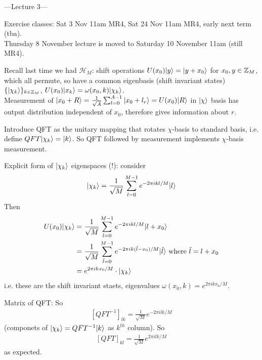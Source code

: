 \documentclass[a4paper]{article}
\begin{document}
---Lecture 3---

Exercise classes: Sat 3 Nov 11am MR4, Sat 24 Nov 11am MR4, early next term (tba).\\
Thursday 8 November lecture is moved to Saturday 10 November 11am (still MR4).

Recall last time we had $\mathcal{H}_M$: shift operations $U(x_0) |y \rangle = |y+x_0\rangle$ for $x_0,y \in \mathbb{Z}_M$, which all permute, so have a common eigenbasis (shift invariant states) $\{|\chi_k\rangle \}_{k \in \mathbb{Z}_M}$, $U(x_0) | x_k\rangle = \omega(x_0,k) |\chi_k\rangle$.\\
Measurement of $|x_0+R \rangle = \frac{1}{\sqrt{A}} \sum_{l=0}^{A-1} |x_0 + l_r \rangle = U(x_0) |R\rangle$ in $|\chi\rangle$ basis has output distribution independent of $x_0$, therefore gives information about $r$.

Introduce QFT as the unitary mapping that rotates $\chi$-basis to standard basis, i.e. define $QFT|\chi_k \rangle = |k\rangle$. So QFT followed by measurement implements $\chi$-basis measurement.

Explicit form of $|\chi_k\rangle$ eigenspaces (!): consider
\begin{equation*}
    \begin{aligned}
        |\chi_k\rangle = \frac{1}{\sqrt{M}}\sum_{l=0}^{M-1} e^{-2\pi i kl/M}|l\rangle
    \end{aligned}
\end{equation*}
Then
\begin{equation*}
    \begin{aligned}
        U(x_0) |\chi_k \rangle &= \frac{1}{\sqrt{M}} \sum_{l=0}^{M-1} e^{-2\pi i kl/M}|l+x_0\rangle \\
        &= \frac{1}{\sqrt{M}} \sum_{\tilde{l}=0}^{M-1} e^{-2\pi i k (\tilde{l}-x_0)/M} | \tilde{l} \rangle \text { where } \tilde{l} = l+x_0\\
        &= e^{2\pi i k x_0 / M} \cdot |\chi_k\rangle
    \end{aligned}
\end{equation*}
i.e. these are the shift invariant staets, eigenvalues $\omega(x_0,k) = e^{2\pi i k x_0/M}$.

Matrix of QFT: So
\begin{equation*}
    \begin{aligned}
        [QFT^{-1}]_{lk} = \frac{1}{\sqrt{M}} e^{-2\pi i lk/M}
    \end{aligned}
\end{equation*}
(componets of $|\chi_k \rangle = QFT^{-1} |k\rangle$ as $k^{th}$ column). So
\begin{equation*}
    \begin{aligned}
        [QFT]_{kl} = \frac{1}{\sqrt{M}} e^{2\pi i lk / M}
    \end{aligned}
\end{equation*}
as expected.
\end{document}
